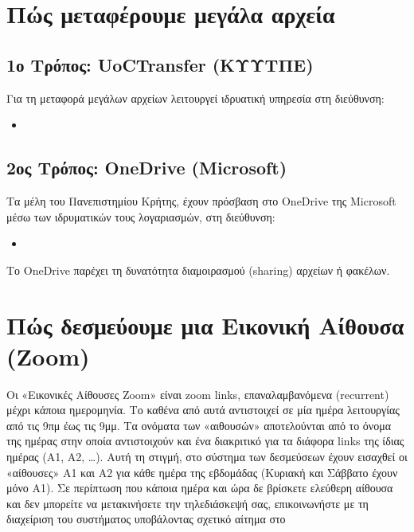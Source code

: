 \documentclass[letterpaper,10pt,greek]{sphinxhowto}
\begin{document}
\sphinxstepscope


\section{Πώς μεταφέρουμε μεγάλα αρχεία}
\label{\detokenize{HowToTransfer:id1}}\label{\detokenize{HowToTransfer::doc}}

\subsection{1ο Τρόπος: UoCTransfer (ΚΥΥΤΠΕ)}
\label{\detokenize{HowToTransfer:uoctransfer}}
\sphinxAtStartPar
Για τη μεταφορά μεγάλων αρχείων λειτουργεί ιδρυατική
υπηρεσία στη διεύθυνση:
\begin{itemize}
\item {} 
\sphinxAtStartPar
{}

\end{itemize}


\subsection{2ος Τρόπος: OneDrive (Microsoft)}
\label{\detokenize{HowToTransfer:onedrive-microsoft}}
\sphinxAtStartPar
Τα μέλη του Πανεπιστημίου Κρήτης, έχουν πρόσβαση στο OneDrive της Microsoft
μέσω των ιδρυματικών τους λογαριασμών, στη διεύθυνση:
\begin{itemize}
\item {} 
\sphinxAtStartPar
{}

\end{itemize}

\sphinxAtStartPar
Το OneDrive παρέχει τη δυνατότητα διαμοιρασμού (sharing) αρχείων ή φακέλων.

\sphinxstepscope


\section{Πώς δεσμεύουμε μια Εικονική Αίθουσα (Zoom)}
\label{\detokenize{HowToZoom:zoom}}\label{\detokenize{HowToZoom::doc}}
\sphinxAtStartPar
Οι «Εικονικές Αίθουσες Zoom» είναι zoom links, επαναλαμβανόμενα (recurrent)
μέχρι κάποια ημερομηνία. Το καθένα από αυτά αντιστοιχεί σε μία ημέρα λειτουργίας
από τις 9πμ έως τις 9μμ. Τα ονόματα των «αιθουσών» αποτελούνται από το όνομα
της ημέρας στην οποία αντιστοιχούν και ένα διακριτικό για τα διάφορα links της
ίδιας ημέρας (Α1, Α2, …). Αυτή τη στιγμή, στο σύστημα των δεσμεύσεων έχουν
εισαχθεί οι «αίθουσες» Α1 και Α2 για κάθε ημέρα της εβδομάδας (Κυριακή και Σάββατο έχουν μόνο Α1).
Σε περίπτωση που κάποια ημέρα και ώρα δε βρίσκετε ελεύθερη αίθουσα και δεν μπορείτε
να μετακινήσετε την τηλεδιάσκεψή σας, επικοινωνήστε με τη διαχείριση του συστήματος
υποβάλοντας σχετικό αίτημα στο 
\end{document}
